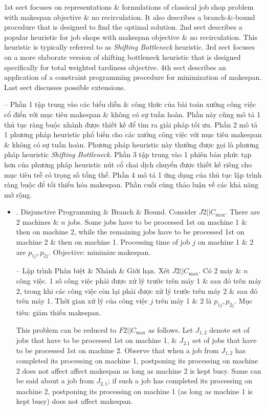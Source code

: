 \documentclass{article}
\begin{document}
\begin{itemize}
    1st sect focuses on representations \& formulations of classical job shop problem with makespan objective \& no recirculation. It also describes a branch-\&-bound procedure that is designed to find the optimal solution. 2nd sect describes a popular heuristic for job shops with makespan objective \& no recirculation. This heuristic is typically referred to as {\it Shifting Bottleneck} heuristic. 3rd sect focuses on a more elaborate version of shifting bottleneck heuristic that is designed specifically for total weighted tardiness objective. 4th sect describes an application of a constraint programming procedure for minimization of makespan. Last sect discusses possible extensions.

    -- Phần 1 tập trung vào các biểu diễn \& công thức của bài toán xưởng công việc cổ điển với mục tiêu makespan \& không có sự tuần hoàn. Phần này cũng mô tả 1 thủ tục ràng buộc nhánh được thiết kế để tìm ra giải pháp tối ưu. Phần 2 mô tả 1 phương pháp heuristic phổ biến cho các xưởng công việc với mục tiêu makespan \& không có sự tuần hoàn. Phương pháp heuristic này thường được gọi là phương pháp heuristic {\it Shifting Bottleneck}. Phần 3 tập trung vào 1 phiên bản phức tạp hơn của phương pháp heuristic nút cổ chai dịch chuyển được thiết kế riêng cho mục tiêu trễ có trọng số tổng thể. Phần 4 mô tả 1 ứng dụng của thủ tục lập trình ràng buộc để tối thiểu hóa makespan. Phần cuối cùng thảo luận về các khả năng mở rộng.
    \begin{itemize}
        \item {. Disjunctive Programming \& Branch \& Bound.} Consider $J2|| C_{\max}$. There are 2 machines \& $n$ jobs. Some jobs have to be processed 1st on machine 1 \& then on machine 2, while the remaining jobs have to be processed 1st on machine 2 \& then on machine 1. Processing time of job $j$ on machine 1 \& 2 are $p_{1j},p_{2j}$. Objective: minimize makespan.

        -- {\sf Lập trình Phân biệt \& Nhánh \& Giới hạn.} Xét $J2|| C_{\max}$. Có 2 máy \& $n$ công việc. 1 số công việc phải được xử lý trước trên máy 1 \& sau đó trên máy 2, trong khi các công việc còn lại phải được xử lý trước trên máy 2 \& sau đó trên máy 1. Thời gian xử lý của công việc $j$ trên máy 1 \& 2 là $p_{1j},p_{2j}$. Mục tiêu: giảm thiểu makespan.

        This problem can be reduced to $F2|| C_{\max}$ as follows. Let $J_{1,2}$ denote set of jobs that have to be processed 1st on machine 1, \& $J_{2.1}$ set of jobs that have to be processed 1st on machine 2. Observe that when a job from $J_{1,2}$ has completed its processing on machine 1, postponing its processing on machine 2 does not affect affect makespan as long as machine 2 is kept busy. Same can be said about a job from $J_{2,1}$; if such a job has completed its processing on machine 2, postponing its processing on machine 1 (as long as machine 1 is kept busy) does not affect makespan.


\end{itemize}
\end{itemize}
\end{document}
